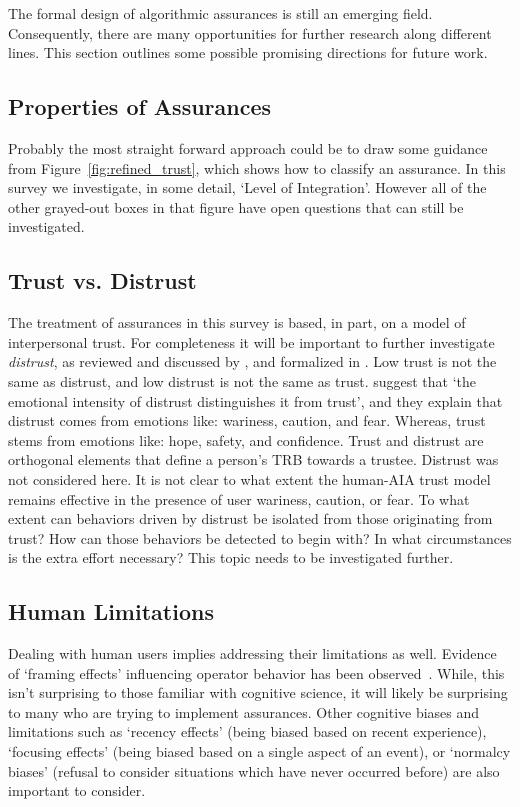 The formal design of algorithmic assurances is still an emerging field. Consequently, there are many opportunities for further research along different lines. This section outlines some possible promising directions for future work.

\subsection{Properties of Assurances} \label{sec:assurance_props_future}
Probably the most straight forward approach could be to draw some guidance from Figure~\ref{fig:refined_trust}, which shows how to classify an assurance. In this survey we investigate, in some detail, `Level of Integration'. However all of the other grayed-out boxes in that figure have open questions that can still be investigated. 









\subsection{Trust vs. Distrust}
The treatment of assurances in this survey is based, in part, on a model of interpersonal trust. For completeness it will be important to further investigate \textit{distrust}, as reviewed and discussed by \citet{Lewicki1998-ox}, and formalized in \citet{McKnight2001-gz}. Low trust is not the same as distrust, and low distrust is not the same as trust. \citet{McKnight2001-gz} suggest that `the emotional intensity of distrust distinguishes it from trust', and they explain that distrust comes from emotions like: wariness, caution, and fear. Whereas, trust stems from emotions like: hope, safety, and confidence. Trust and distrust are orthogonal elements that define a person's TRB towards a trustee. Distrust was not considered here. It is not clear to what extent the human-AIA trust model remains effective in the presence of user wariness, caution, or fear. To what extent can behaviors driven by distrust be isolated from those originating from trust? How can those behaviors be detected to begin with? In what circumstances is the extra effort necessary? This topic needs to be investigated further.

\subsection{Human Limitations}
Dealing with human users implies addressing their limitations as well. Evidence of `framing effects' influencing operator behavior has been observed~\cite{Freedy2007-sg,Riley1996-qm}. While, this isn't surprising to those familiar with cognitive science, it will likely be surprising to many who are trying to implement assurances. Other cognitive biases and limitations such as `recency effects' (being biased based on recent experience), `focusing effects' (being biased based on a single aspect of an event), or `normalcy biases' (refusal to consider situations which have never occurred before) are also important to consider. 

